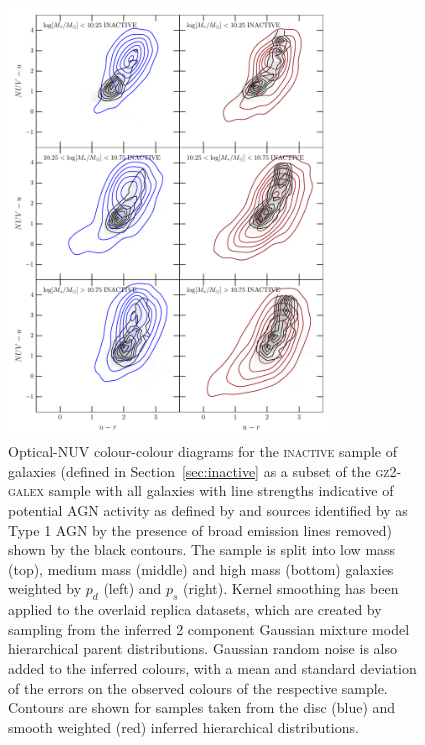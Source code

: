 \begin{figure}
\begin{centering}
\includegraphics[width=0.76\textwidth]{starpy/figc2b.pdf}
\caption[Replica colour-colour distributions using a hierarchical method]{Optical-NUV colour-colour diagrams for the \textsc{inactive} {\minor sample of galaxies (defined in Section~\ref{sec:inactive} as a subset of the \textsc{gz2-galex} sample with all galaxies with line strengths indicative of potential AGN activity as defined by \citealt{kauffmann03b} and sources identified by \citealt{Oh15} as Type 1 AGN by the presence of broad emission lines removed)} shown by the black contours. The sample is split into low mass (top), medium mass (middle) and high mass (bottom) galaxies weighted by $p_d$ (left) and $p_s$ (right). Kernel smoothing has been applied to the overlaid replica datasets, which are created by sampling from the inferred 2 component Gaussian mixture model hierarchical parent distributions. Gaussian random noise is also added to the inferred colours, with a mean and standard deviation of the errors on the observed colours of the respective sample. Contours are shown for samples taken from the disc (blue) and smooth weighted (red) inferred hierarchical distributions.}
\label{replica}
\end{centering}
\end{figure}

